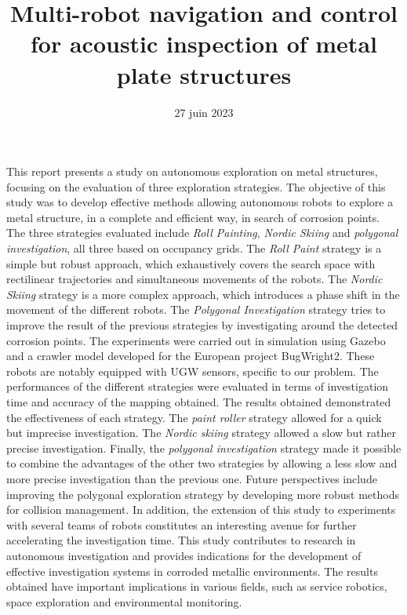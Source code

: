 \documentclass[francais,RandD]{rapportPFE}
\title{Multi-robot navigation and control for acoustic inspection of metal plate structures}
\date{27 juin 2023}
\begin{document}
	\maketitle
	\begin{ResumeMotsCles}
		\begin{resumeEn}
			{\scriptsize
				This report presents a study on autonomous exploration on metal structures, focusing on the evaluation of three exploration strategies.
				The objective of this study was to develop effective methods allowing autonomous robots to explore a metal structure, in a complete and efficient way, in search of corrosion points.
				The three strategies evaluated include \textit{Roll Painting}, \textit{Nordic Skiing} and \textit{polygonal investigation}, all three based on occupancy grids.
				The \textit{Roll Paint} strategy is a simple but robust approach, which exhaustively covers the search space with rectilinear trajectories and simultaneous movements of the robots.
				The \textit{Nordic Skiing} strategy is a more complex approach, which introduces a phase shift in the movement of the different robots.
				The \textit{Polygonal Investigation} strategy tries to improve the result of the previous strategies by investigating around the detected corrosion points.
				The experiments were carried out in simulation using Gazebo and a crawler model developed for the European project BugWright2.
				These robots are notably equipped with UGW sensors, specific to our problem.
				The performances of the different strategies were evaluated in terms of investigation time and accuracy of the mapping obtained.
				The results obtained demonstrated the effectiveness of each strategy.
				The \textit{paint roller} strategy allowed for a quick but imprecise investigation. The \textit{Nordic skiing} strategy allowed a slow but rather precise investigation.
				Finally, the \textit{polygonal investigation} strategy made it possible to combine the advantages of the other two strategies by allowing a less slow and more precise investigation than the previous one.
				Future perspectives include improving the polygonal exploration strategy by developing more robust methods for collision management.
				In addition, the extension of this study to experiments with several teams of robots constitutes an interesting avenue for further accelerating the investigation time.
				This study contributes to research in autonomous investigation and provides indications for the development of effective investigation systems in corroded metallic environments.
				The results obtained have important implications in various fields, such as service robotics, space exploration and environmental monitoring.
}
\end{resumeEn}
\end{ResumeMotsCles}
\end{document}
